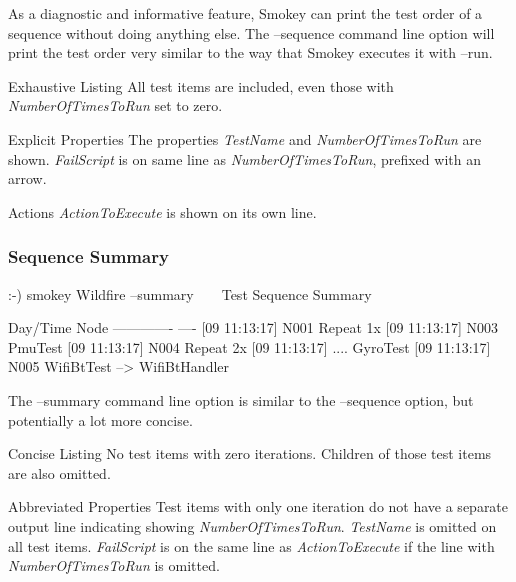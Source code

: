 \documentclass[11pt]{article}
\newlength{\ElideShift}
\newcommand{\elide}{%
		\makebox[0in][l]{%
			\setlength{\ElideShift}{-5.2pt}%
			\addtolength{\ElideShift}{-2em}%
			\hspace{\ElideShift}%
			\begin{tikzpicture}[%
				every path/.style={%
					decoration={%
						complete sines,%
						segment length=2em,%
						amplitude=0.5ex%
						},%
					decorate%
					}%
				]%
				\draw[color=white, yshift=0.475ex, line width=0.575ex] (-2em-0.5pt,0) -- (\linewidth+6.7pt+2em,0);%
				\draw[color=SmokeyDarkBlue, yshift=0.85ex] (0,0) -- (\linewidth+6.7pt,0);%
				\draw[color=SmokeyDarkBlue, yshift=0.15ex] (0,0) -- (\linewidth+6.7pt,0);%
			\end{tikzpicture}%
			}%
		}%
\newcommand{\prop}[1]{{\itshape#1}}
\newcommand{\keyword}[1]{\mbox{\ttfamily#1}}
\begin{document}
As a diagnostic and informative feature, Smokey can print the test order of a
sequence without doing anything else.  The \keyword{--sequence} command line option will
print the test order very similar to the way that Smokey executes it with
\keyword{--run}.

\begin{Property}

\item[Exhaustive Listing] All test items are included, even those with
	\prop{NumberOfTimesToRun} set to zero.

\item[Explicit Properties] The properties \prop{TestName} and \prop{NumberOfTimesToRun} are
	shown.  \prop{FailScript} is on same line as \prop{NumberOfTimesToRun}, prefixed
	with an arrow.

\item[Actions] \prop{ActionToExecute} is shown on its own line.

\end{Property}

\subsubsection{Sequence Summary}

\begin{LogExcerpt}
:-) smokey Wildfire --summary
~\elide~
Test Sequence Summary

Day/Time      Node
------------- ----
[09 11:13:17] N001 Repeat 1x
[09 11:13:17] N003      PmuTest
[09 11:13:17] N004      Repeat 2x
[09 11:13:17] ....              GyroTest
[09 11:13:17] N005      WifiBtTest --> WifiBtHandler
\end{LogExcerpt}

The \keyword{--summary} command line option is similar to the \keyword{--sequence} option, but
potentially a lot more concise.

\begin{Property}

\item[Concise Listing] No test items with zero iterations.  Children of those
	test items are also omitted.

\item[Abbreviated Properties] Test items with only one iteration do not have a
	separate output line indicating showing \prop{NumberOfTimesToRun}.  \prop{TestName}
	is omitted on all test items.  \prop{FailScript} is on the same line as
	\prop{ActionToExecute} if the line with \prop{NumberOfTimesToRun} is omitted.

\end{Property}
\end{document}
